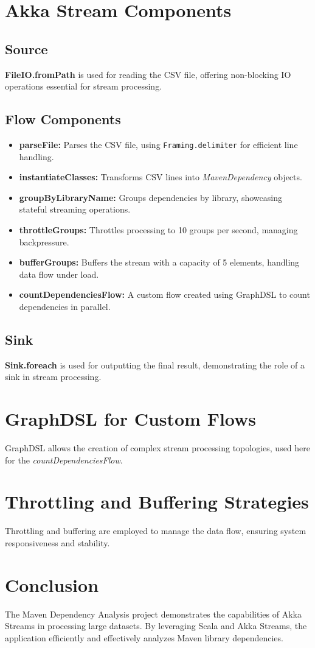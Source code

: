 \documentclass{article}
\begin{document}
    \section{Akka Stream Components}

    \subsection{Source}
    \textbf{FileIO.fromPath} is used for reading the CSV file, offering non-blocking IO operations essential for stream processing.

    \subsection{Flow Components}
    \begin{itemize}
        \item \textbf{parseFile:} Parses the CSV file, using \texttt{Framing.delimiter} for efficient line handling.
        \item \textbf{instantiateClasses:} Transforms CSV lines into \textit{MavenDependency} objects.
        \item \textbf{groupByLibraryName:} Groups dependencies by library, showcasing stateful streaming operations.
        \item \textbf{throttleGroups:} Throttles processing to 10 groups per second, managing backpressure.
        \item \textbf{bufferGroups:} Buffers the stream with a capacity of 5 elements, handling data flow under load.
        \item \textbf{countDependenciesFlow:} A custom flow created using GraphDSL to count dependencies in parallel.
    \end{itemize}

    \subsection{Sink}
    \textbf{Sink.foreach} is used for outputting the final result, demonstrating the role of a sink in stream processing.

    \section{GraphDSL for Custom Flows}
    GraphDSL allows the creation of complex stream processing topologies, used here for the \textit{countDependenciesFlow}.

    \section{Throttling and Buffering Strategies}
    Throttling and buffering are employed to manage the data flow, ensuring system responsiveness and stability.

    \section{Conclusion}
    The Maven Dependency Analysis project demonstrates the capabilities of Akka Streams in processing large datasets. By leveraging Scala and Akka Streams, the application efficiently and effectively analyzes Maven library dependencies.
\end{document}
